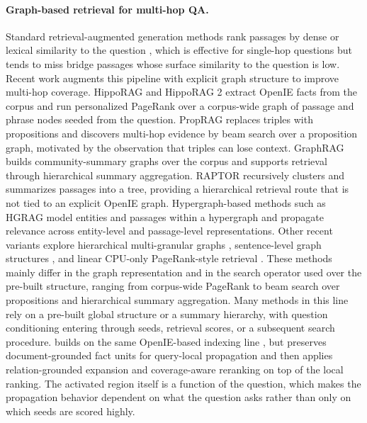 \paragraph{Graph-based retrieval for multi-hop QA.}
Standard retrieval-augmented generation methods rank passages by dense
or lexical similarity to the question
\citep{karpukhin2020dpr,robertson2009bm25}, which is effective for
single-hop questions but tends to miss bridge passages whose surface
similarity to the question is low. Recent work augments this pipeline
with explicit graph structure to improve multi-hop coverage.
HippoRAG \citep{jimenez2024hipporag} and HippoRAG 2
\citep{gutierrez2025hipporag} extract OpenIE facts from the corpus and
run personalized PageRank over a corpus-wide graph of passage and
phrase nodes seeded from the question. PropRAG \citep{wang2025proprag}
replaces triples with propositions and discovers multi-hop evidence by
beam search over a proposition graph, motivated by the observation that
triples can lose context. GraphRAG \citep{edge2024graphrag} builds
community-summary graphs over the corpus and supports retrieval through
hierarchical summary aggregation. RAPTOR \citep{sarthi2024raptor}
recursively clusters and summarizes passages into a tree, providing a
hierarchical retrieval route that is not tied to an explicit OpenIE
graph. Hypergraph-based methods such as HGRAG \citep{hgrag2024} model
entities and passages within a hypergraph and propagate relevance across
entity-level and passage-level representations. Other recent variants explore
hierarchical multi-granular graphs \citep{hu2026mgrangrag},
sentence-level graph structures \citep{liang2026sentgraph}, and
linear CPU-only PageRank-style retrieval \citep{wang2026sprig}.
These methods mainly differ in the graph representation and in the
search operator used over the pre-built structure, ranging from
corpus-wide PageRank to beam search over propositions and hierarchical
summary aggregation. Many methods in this line rely on a pre-built
global structure or a summary hierarchy, with question conditioning
entering through seeds, retrieval scores, or a subsequent search
procedure. \methodname{} builds on the same OpenIE-based indexing line
\citep{angeli2015leveraging,gutierrez2025hipporag}, but preserves
document-grounded fact units for query-local propagation and then
applies relation-grounded expansion and coverage-aware reranking on top
of the local ranking. The activated region itself is a function of the
question, which makes the propagation behavior dependent on what the
question asks rather than only on which seeds are scored highly.

